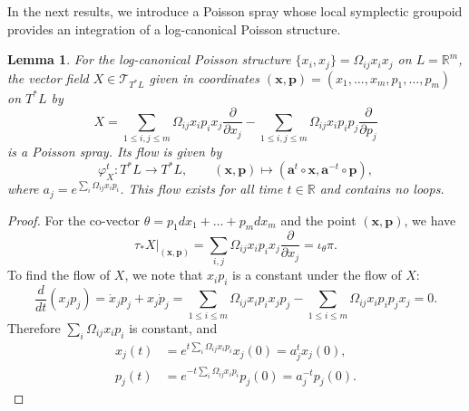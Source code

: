 \documentclass{amsart}
\newtheorem{lemma}[theorem]{Lemma}
\numberwithin{equation}{section}
\newcommand{\bfa}{{\boldsymbol{a}}}
\newcommand{\bfp}{{\boldsymbol{p}}}
\newcommand{\bfx}{{\boldsymbol{x}}}
\newcommand{\cT}{\mathcal{T}}
\newcommand{\RR}{\mathbb{R}}
\begin{document}
In the next results, we introduce a Poisson spray whose local symplectic groupoid provides an integration of a log-canonical Poisson structure.
\begin{lemma} 
  \label{lemma:PoisSp}
  For the log-canonical Poisson structure $\{x_i, x_j\} = \Omega_{ij} x_i x_j$ on $L = \RR^m$, the vector field $X \in \cT_{T^*L}$ given in coordinates $(\bfx, \bfp) = (x_1, \ldots, x_m, p_1, \ldots, p_m)$ on $T^*L$ by
  \begin{equation} 
    \label{eq: PoisSp}
    X = \sum_{1 \leq i,j \leq m}\Omega_{ij}x_i p_i x_j\frac{\partial}{\partial x_j} - \sum_{1 \leq i,j \leq m}\Omega_{ij}x_ip_i p_j\frac{\partial}{\partial p_j}
  \end{equation}
  is a Poisson spray.
  Its flow is given by
  \[\varphi_X^t: T^*L \to T^*L, \qquad (\bfx, \bfp) \mapsto (\bfa^t \circ \bfx, \bfa^{-t} \circ \bfp),\]
  where $a_j = e^{\sum_i \Omega_{ij} x_ip_i}$.
  This flow exists for all time $t \in \RR$ and contains no loops.
\end{lemma}

\begin{proof}
  For the co-vector $\theta = p_1 dx_1 + \ldots + p_m dx_m$ and the point $(\bfx, \bfp)$, we have
  \[\tau_* X|_{(\bfx,\bfp)} = \sum_{i, j}\Omega_{ij} x_i p_i x_j \frac{\partial}{\partial x_j} = \iota_\theta \pi.\]
  To find the flow of $X$, we note that $x_i p_i$ is a constant under the flow of $X$:
  \[\frac{d}{dt}(x_j p_j) = \dot{x}_j p_j + x_j \dot{p}_j = \sum_{1 \leq i \leq m}\Omega_{ij}x_i p_i x_j p_j - \sum_{1 \leq i \leq m}\Omega_{ij}x_ip_i p_j x_j = 0.\]
  Therefore $\sum_{i}\Omega_{ij}x_i p_i$ is constant, and
  \begin{align*}
    x_j(t) & = e^{t \sum_i \Omega_{ij} x_ip_i} x_j(0) = a_j^t x_j(0), \\
    p_j(t) & = e^{-t \sum_i \Omega_{ij} x_ip_i} p_j(0) = a_j^{-t} p_j(0).
  \end{align*}
\end{proof}
\end{document}
